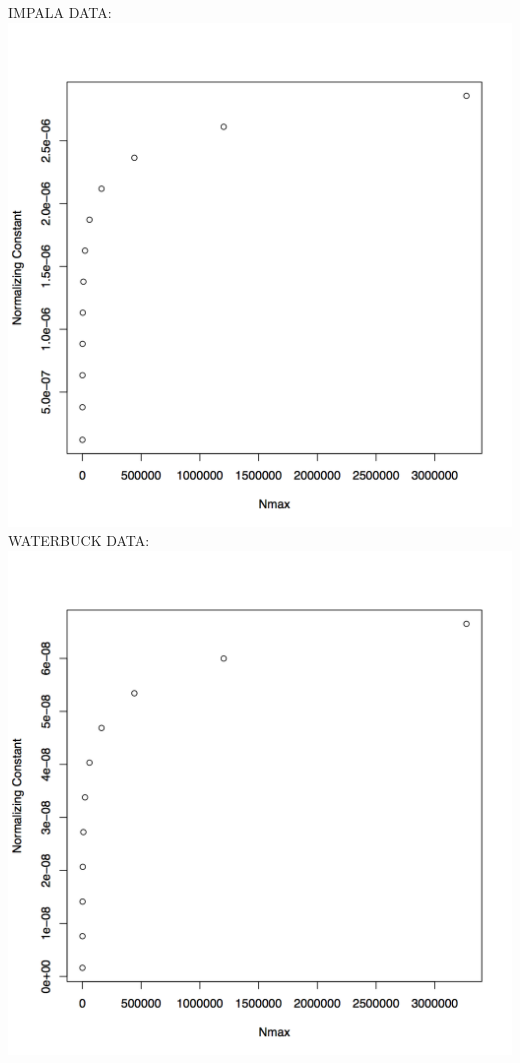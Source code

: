 \documentclass[10pt]{article}
\begin{document}
\pagebreak
IMPALA DATA:\\
\includegraphics[scale=0.75]{impalanormc.png}\\
\pagebreak
WATERBUCK DATA:\\
\includegraphics[scale=0.75]{waterbucknormc.png}
\end{document}
